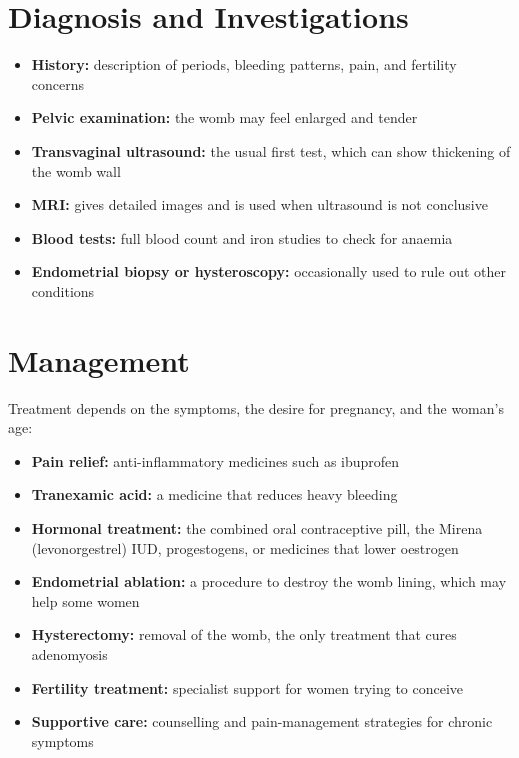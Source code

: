 \section*{Diagnosis and Investigations}
\begin{itemize}
    \item \textbf{History:} description of periods, bleeding patterns, pain, and fertility concerns
    \item \textbf{Pelvic examination:} the womb may feel enlarged and tender
    \item \textbf{Transvaginal ultrasound:} the usual first test, which can show thickening of the womb wall
    \item \textbf{MRI:} gives detailed images and is used when ultrasound is not conclusive
    \item \textbf{Blood tests:} full blood count and iron studies to check for anaemia
    \item \textbf{Endometrial biopsy or hysteroscopy:} occasionally used to rule out other conditions
\end{itemize}

\section*{Management}
Treatment depends on the symptoms, the desire for pregnancy, and the woman's age:

\begin{itemize}
    \item \textbf{Pain relief:} anti-inflammatory medicines such as ibuprofen
    \item \textbf{Tranexamic acid:} a medicine that reduces heavy bleeding
    \item \textbf{Hormonal treatment:} the combined oral contraceptive pill, the Mirena (levonorgestrel) IUD, progestogens, or medicines that lower oestrogen
    \item \textbf{Endometrial ablation:} a procedure to destroy the womb lining, which may help some women
    \item \textbf{Hysterectomy:} removal of the womb, the only treatment that cures adenomyosis
    \item \textbf{Fertility treatment:} specialist support for women trying to conceive
    \item \textbf{Supportive care:} counselling and pain-management strategies for chronic symptoms
\end{itemize}

